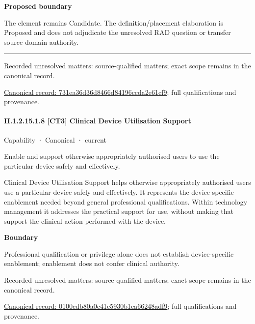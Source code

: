 \textbf{Proposed boundary}



The element remains Candidate. The definition/placement elaboration is Proposed and does not adjudicate the unresolved RAD question or transfer source-domain authority.



\medskip\hrule\medskip

{\small Recorded unresolved matters: source-qualified matters; exact scope remains in the canonical record.}\par
{\footnotesize \href{../../../../continuum/strategy/capability/731ea36d36d8466d84196ccda2e61cf9.md}{Canonical record: 731ea36d36d8466d84196ccda2e61cf9}; full qualifications and provenance.}\par
\paragraph*{II.1.2.15.1.8 [CT3] Clinical Device Utilisation Support}
\label{navigation:II.1.2.15.1.8}

\label{element:0100cdb80a0c41c5930b1ca66248adf9}
{\small Capability · Canonical · current}\par

Enable and support otherwise appropriately authorised users to use the particular device safely and effectively.



Clinical Device Utilisation Support helps otherwise appropriately authorised users use a particular device safely and effectively. It represents the device-specific enablement needed beyond general professional qualifications. Within technology management it addresses the practical support for use, without making that support the clinical action performed with the device.



\textbf{Boundary}



Professional qualification or privilege alone does not establish device-specific enablement; enablement does not confer clinical authority.


{\small Recorded unresolved matters: source-qualified matters; exact scope remains in the canonical record.}\par
{\footnotesize \href{../../../../continuum/strategy/capability/0100cdb80a0c41c5930b1ca66248adf9.md}{Canonical record: 0100cdb80a0c41c5930b1ca66248adf9}; full qualifications and provenance.}\par
